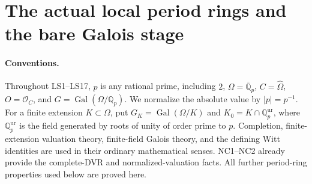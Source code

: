 \section{The actual local period rings and the bare Galois stage}
\label{sec:local-stages}


\paragraph{Conventions.}
Throughout LS1--LS17, $p$ is any rational prime, including $2$,
$\Omega=\overline{\mathbb Q}_p$, $C=\widehat\Omega$, $O=\mathcal O_C$,
and $G=\operatorname{Gal}(\Omega/\mathbb Q_p)$. We normalize the
absolute value by $|p|=p^{-1}$. For a finite extension
$K\subset\Omega$, put $G_K=\operatorname{Gal}(\Omega/K)$ and
$K_0=K\cap\mathbb Q_p^{\mathrm{ur}}$, where
$\mathbb Q_p^{\mathrm{ur}}$ is the field generated by roots of unity of
order prime to $p$. Completion, finite-extension valuation theory,
finite-field Galois theory, and the defining Witt identities are used in
their ordinary mathematical senses. NC1--NC2 already provide the
complete-DVR and normalized-valuation facts. All further period-ring
properties used below are proved here.

